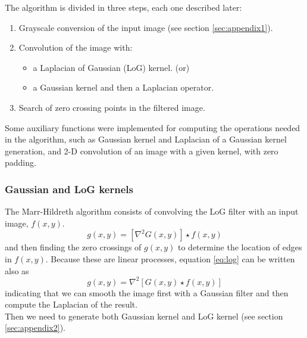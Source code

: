 \documentclass{ipol}
\numberwithin{equation}{section}
\numberwithin{table}{section}
\begin{document}
The algorithm is divided in three steps, each one described later:
\begin{enumerate}
	\item Grayscale conversion of the input image (see section \ref{sec:appendix1}).
	\item Convolution of the image with:
	\begin{itemize}
		\item a Laplacian of Gaussian (LoG) kernel. (or)
		\item a Gaussian kernel and then a Laplacian operator.
	\end{itemize}
	\item Search of zero crossing points in the filtered image.\\
\end{enumerate}

Some auxiliary functions were implemented for computing the operations
needed in the algorithm, such as Gaussian kernel and Laplacian of a Gaussian 
kernel generation, and 2-D convolution of an image with a given kernel, 
with zero padding.\\



\subsubsection{Gaussian and LoG kernels}

The Marr-Hildreth algorithm consists of convolving the LoG filter with an input image, $f(x,y)$.
\begin{equation}\label{eq:log}
  g(x,y) = [\nabla^2G(x,y)]\star f(x,y)
\end{equation}
and then finding the zero crossings of $g(x,y)$ to determine the location of edges in $f(x,y)$. 
Because these are linear processes, equation \ref{eq:log} can be written also as
\begin{equation}
  g(x,y) = \nabla^2[G(x,y)\star f(x,y)]
\end{equation}
indicating that we can smooth the image first with a Gaussian filter and then compute the Laplacian of the result.\\

Then we need to generate both Gaussian kernel and LoG kernel (see section \ref{sec:appendix2}).\\
\end{document}
